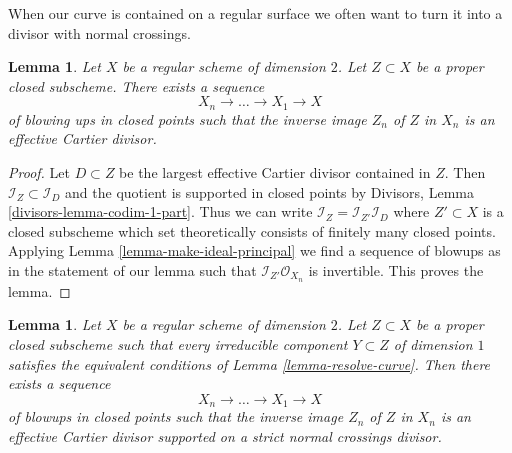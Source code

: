 \documentclass{stacks-project}
\theoremstyle{plain}
\newtheorem{lemma}[subsection]{Lemma}
\theoremstyle{definition}
\theoremstyle{remark}
\numberwithin{equation}{subsection}
\begin{document}
\noindent
When our curve is contained on a regular surface we often want to
turn it into a divisor with normal crossings.

\begin{lemma}
\label{lemma-turn-into-effective-Cartier}
Let $X$ be a regular scheme of dimension $2$. Let $Z \subset X$
be a proper closed subscheme. There exists a sequence
$$
X_n \to \ldots \to X_1 \to X
$$
of blowing ups in closed points such that the inverse image $Z_n$ of $Z$
in $X_n$ is an effective Cartier divisor.
\end{lemma}

\begin{proof}
Let $D \subset Z$ be the largest effective Cartier divisor contained in $Z$.
Then $\mathcal{I}_Z \subset \mathcal{I}_D$ and the quotient is supported
in closed points by Divisors, Lemma \ref{divisors-lemma-codim-1-part}.
Thus we can write $\mathcal{I}_Z = \mathcal{I}_{Z'} \mathcal{I}_D$
where $Z' \subset X$ is a closed subscheme which set theoretically
consists of finitely many closed points. Applying
Lemma \ref{lemma-make-ideal-principal}
we find a sequence of blowups as in the statement of our lemma
such that $\mathcal{I}_{Z'}\mathcal{O}_{X_n}$ is invertible.
This proves the lemma.
\end{proof}

\begin{lemma}
\label{lemma-embedded-resolution}
Let $X$ be a regular scheme of dimension $2$. Let $Z \subset X$
be a proper closed subscheme such that every irreducible component
$Y \subset Z$ of dimension $1$ satisfies the equivalent conditions of
Lemma \ref{lemma-resolve-curve}. Then there exists a sequence
$$
X_n \to \ldots \to X_1 \to X
$$
of blowups in closed points such that the inverse image $Z_n$ of $Z$
in $X_n$ is an effective Cartier divisor supported on a strict normal crossings
divisor.
\end{lemma}
\end{document}
